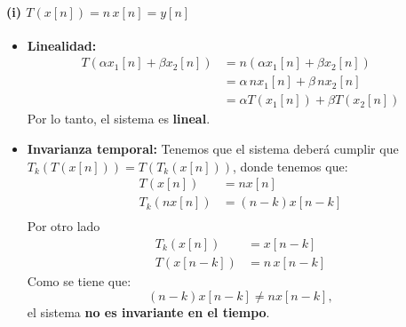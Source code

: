 \documentclass[
  11pt,
  letterpaper,
   addpoints,
   answers
  ]{exam}
\begin{document}
\begin{questions}
\begin{solution}
  \paragraph{(i) $T(x[n])= n \, x[n] = y[n]$}
\begin{itemize}
  \item \textbf{Linealidad:}
  \begin{align}
  T(\alpha x_1[n] + \beta x_2[n]) 
    &= n(\alpha x_1[n] + \beta x_2[n]) \\
    &= \alpha \, n x_1[n] + \beta \, n x_2[n] \\
    &= \alpha T(x_1[n]) + \beta T(x_2[n])
  \end{align}
  Por lo tanto, el sistema es \textbf{lineal}.
  \item \textbf{Invarianza temporal:}
  Tenemos que el sistema deberá cumplir que $T_{k}(T(x[n])) = T(T_{k}(x[n]))$, donde tenemos que:
  \begin{align}
  T(x[n]) &= n x[n] \\
  T_k(n x[n]) &= (n-k)x[n-k] \\
  \end{align}
  Por otro lado
  \begin{align}
  T_k(x[n]) &= x[n-k]\\
  T(x[n-k]) &= n \, x[n-k]
  \end{align}
  Como se tiene que:
  \begin{equation}
  (n-k)x[n-k] \neq n x[n-k],
  \end{equation}
  el sistema \textbf{no es invariante en el tiempo}.
\end{itemize}


\end{solution}
\end{questions}
\end{document}
